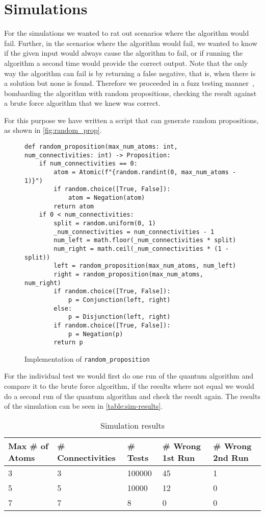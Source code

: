 \section{Simulations}\label{sec:simulations}

For the simulations we wanted to rat out scenarios where the algorithm would fail.
Further, in the scenarios where the algorithm would fail, we wanted to know if the given input would always cause the algorithm to fail, or if running the algorithm a second time would provide the correct output.
Note that the only way the algorithm can fail is by returning a false negative, that is, when there is a solution but none is found.
Therefore we proceeded in a fuzz testing manner~\cite{miller1990empirical}, bombarding the algorithm with random propositions, checking the result against a brute force algorithm that we knew was correct.

For this purpose we have written a script that can generate random propositions, as shown in \autoref{fig:random_prop}.

\begin{figure}[H]
\centering
\begin{verbatim}
def random_proposition(max_num_atoms: int, num_connectivities: int) -> Proposition:
    if num_connectivities == 0:
        atom = Atomic(f"{random.randint(0, max_num_atoms - 1)}")
        if random.choice([True, False]):
            atom = Negation(atom)
        return atom
    if 0 < num_connectivities:
        split = random.uniform(0, 1)
        _num_connectivities = num_connectivities - 1
        num_left = math.floor(_num_connectivities * split)
        num_right = math.ceil(_num_connectivities * (1 - split))
        left = random_proposition(max_num_atoms, num_left)
        right = random_proposition(max_num_atoms, num_right)
        if random.choice([True, False]):
            p = Conjunction(left, right)
        else:
            p = Disjunction(left, right)
        if random.choice([True, False]):
            p = Negation(p)
        return p
\end{verbatim}
\caption{Implementation of \texttt{random\_proposition} }
\label{fig:random_prop}
\end{figure}

For the individual test we would first do one run of the quantum algorithm and compare it to the brute force algorithm, if the results where not equal we would do a second run of the quantum algorithm and check the result again.
The results of the simulation can be seen in \autoref{table:sim-results}.

\begin{table}[h!]
\centering
\begin{tabularx}{\textwidth}{|X|X|X|X|X|}
\hline
Max \# of Atoms & \# Connectivities & \# Tests &  \# Wrong 1st Run & \# Wrong 2nd Run \\
\hline
3 & 3 & 100000 & 45 & 1 \\
5 & 5 &  10000 & 12 & 0 \\
7 & 7 &      8 &  0 & 0 \\
\hline
\end{tabularx}
\caption{Simulation results}
\label{table:sim-results}
\end{table}
